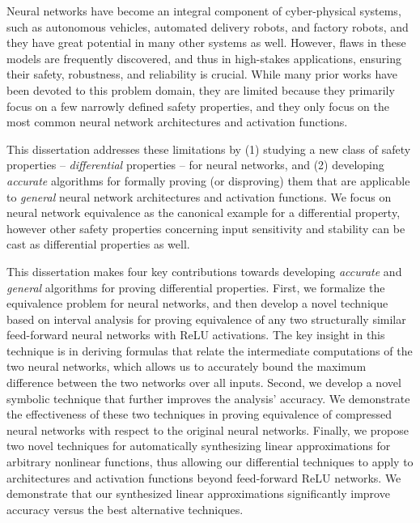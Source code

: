 Neural networks have become an integral component of cyber-physical systems, such
as autonomous vehicles, automated delivery robots, and factory robots, and they
have great potential in many other systems as well.
%
However, flaws in these models are frequently discovered, and thus in high-stakes
applications, ensuring their safety, robustness, and reliability is crucial.
%
While many prior works have been devoted to this problem domain, they are limited
because they primarily focus on a few narrowly defined safety properties, and
they only focus on the most common neural network architectures and activation
functions.

This dissertation addresses these limitations by (1) studying a new class of
safety properties -- \textit{differential} properties -- for neural networks,
%
and (2)  developing \textit{accurate} algorithms for formally proving (or
disproving) them that are applicable to \textit{general} neural network
architectures and
activation functions.
%
We focus on neural network equivalence as the canonical example for a
differential property, however other safety properties concerning input
sensitivity and stability can be cast as differential properties as well.

This dissertation makes four key contributions towards developing
\textit{accurate} and \textit{general} algorithms for proving differential
properties.
%
First, we formalize the equivalence problem for neural networks, and then develop
a novel technique based on interval analysis for proving equivalence of any two
structurally similar feed-forward neural networks with ReLU activations.
%
The key insight in
this technique is in deriving formulas that relate the intermediate computations
of the two neural networks, which allows us to accurately bound the maximum
difference between the two networks over all inputs.
%
Second, we develop a novel symbolic technique that further improves the
analysis' accuracy.
%
We demonstrate the effectiveness of these two techniques in
proving equivalence of compressed neural networks with respect to the original
neural networks.
%
Finally, we propose two novel techniques for automatically synthesizing
linear approximations for arbitrary nonlinear functions, thus allowing our
differential techniques to apply to architectures and activation functions beyond
feed-forward ReLU networks.
%
We demonstrate that our synthesized linear approximations significantly improve
accuracy versus the best alternative techniques.